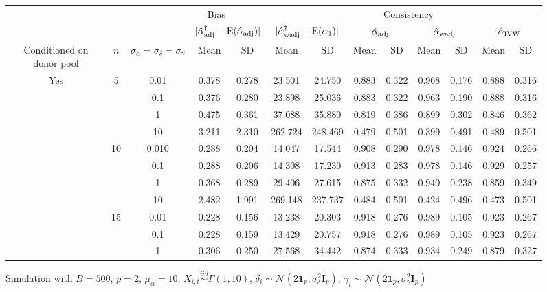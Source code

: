\documentclass[11pt]{article}
\newcommand{\simiid}{\stackrel{iid}{\sim}} %
\def\normal#1#2{\mathcal{N}(#1,#2)} %
\def\E#1{\mathrm{E}(#1)} %
\theoremstyle{definition}
\begin{document}
\begin{sidewaysfigure}
\centering
\caption{Simulation  with $B = 500$, $p = 2$, $\mu_{\alpha}=10$, $X_{i,t} \simiid \Gamma(1,10)$, $\delta_i \sim \normal{2\mathbf{1}_p}{\sigma^2_{\delta}\mathbf{I}_p}$, $\gamma_i \sim \normal{2\mathbf{1}_p}{\sigma^2_{\gamma}\mathbf{I}_p}$ }
\begin{tabular}{c|cccccc|cccccc}
  && \multicolumn{4}{c|}{Bias}  & \multicolumn{6}{c}{Consistency}  \\ 
 &  & & \multicolumn{2}{c}{$|\hat{\alpha}_{\rm adj}^{\dagger}-\E{\hat{\alpha}_{\rm adj}}|$} & \multicolumn{2}{c|}{$|\hat{\alpha}_{\rm wadj}^{\dagger}-\E{\alpha_1}|$} & \multicolumn{2}{c}{$\hat{\alpha}_{\rm adj}$}  & \multicolumn{2}{c}{$\hat{\alpha}_{\rm wadj}$}  & \multicolumn{2}{c}{$\hat{\alpha}_{\rm IVW}$}  \\ 
Conditioned on donor pool & $n$   & $\sigma_{\alpha} = \sigma_{\delta}=\sigma_{\gamma}$  & Mean & SD & Mean & SD & Mean & SD & Mean & SD & Mean & SD\\[.3cm]  
  \hline
\multirow{16}{*}{Yes} & \multirow{4}{*}{5} & 0.01  & 0.378 & 0.278 & 23.501 & 24.750 & 0.883 & 0.322 & 0.968 & 0.176 & 0.888 & 0.316 \\ 
 & & 0.1 & 0.376 & 0.280 & 23.898 & 25.036 & 0.883 & 0.322 & 0.963 & 0.190 & 0.888 & 0.316 \\ 
&  & 1 & 0.475 & 0.361 & 37.088 & 35.880 & 0.819 & 0.386 & 0.899 & 0.302 & 0.846 & 0.362 \\ 
 & & 10  & 3.211 & 2.310 & 262.724 & 248.469 & 0.479 & 0.501 & 0.399 & 0.491 & 0.489 & 0.501 \\[.3cm]  
& \multirow{4}{*}{10}  & 0.010  & 0.288 & 0.204 & 14.047 & 17.544 & 0.908 & 0.290 & 0.978 & 0.146 & 0.924 & 0.266 \\ 
& & 0.1  & 0.288 & 0.206 & 14.308 & 17.230 & 0.913 & 0.283 & 0.978 & 0.146 & 0.929 & 0.257 \\ 
 &  & 1  & 0.368 & 0.289 & 29.406 & 27.615 & 0.875 & 0.332 & 0.940 & 0.238 & 0.859 & 0.349 \\ 
 &  & 10  & 2.482 & 1.991 & 269.148 & 237.737 & 0.484 & 0.501 & 0.424 & 0.496 & 0.473 & 0.501 \\[.3cm]  
& \multirow{4}{*}{15} & 0.01   & 0.228 & 0.156 & 13.238 & 20.303 & 0.918 & 0.276 & 0.989 & 0.105 & 0.923 & 0.267 \\ 
& &0.1  & 0.228 & 0.159 & 13.429 & 20.757 & 0.918 & 0.276 & 0.989 & 0.105 & 0.923 & 0.267 \\ 
 &  & 1 & 0.306 & 0.250 & 27.568 & 34.442 & 0.874 & 0.333 & 0.934 & 0.249 & 0.879 & 0.327 \\ 

\end{tabular}
\end{sidewaysfigure}
\end{document}
